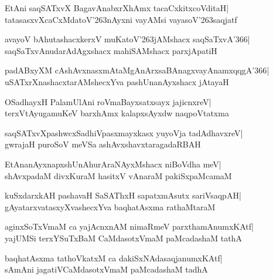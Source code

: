 \documentclass[twoside,12pt,openright]{book}
\def\S{\char'263}
\newcounter{shloka}[chapter]
\begin{document}
\begin{shloka}%
EtAni saqSATxvX BagavAnabxrXhAmx tacaCxkitxcoVditaH|\\
tatasasxvXcaCxMdatoV\S nAyxni vayAMsi vayasoV\S saqjatf
\end{shloka}

\begin{shloka}%
avayoV bAhutashacxkerxV muKatoV\S jAMshacx saqSaTxvA\char'366|\\
saqSaTxvAnudarAdAgxshacx mahiSAMshacx parxjApatiH
\end{shloka}

\begin{shloka}%
padABxyXM cAshAvxnasxmAtaMgAnArxsaBAnagxvayAnamxqqgA\char'366|\\
uSATxrXnashacxtarAMshecxYva pashUnanAyxshacx jAtayaH
\end{shloka}

\begin{shloka}%
OSadhayxH PalamUlAni roVmaBayxsatxsayx jajicnxreV|\\
terxVtAyugamuKeV barxhAmx kalapxsAyxdw naqpoVtatxma
\end{shloka}

\begin{shloka}%
saqSATxvXpashwcxSadhiVpasxmayxkasx yuyoVja tadAdhavxreV|\\
gwrajaH puroSoV meVSa ashAvxshavxtaragadaRBAH
\end{shloka}

\begin{shloka}%
EtAnanAyxnapxshUnAhurAraNAyxMshacx niBoVdha meV|\\
shAvxpadaM divxKuraM hasitxV vAnaraM pakiSxpaMcamaM
\end{shloka}

\begin{shloka}%
kuSxdarxkAH pashavaH SaSAThxH sapatxmAsutx sariVsaqpAH|\\
gAyatarxvatasxyXvashecxYva baqhatAsxma rathaMtaraM
\end{shloka}

\begin{shloka}%
aginxSoTxVmaM ca yajAcnxnAM nimaRmeV parxthamAnumxKAtf|\\
yajUMSi terxYSuTxBaM CaMdasotxVmaM paMcadashaM tathA
\end{shloka}

\begin{shloka}%
baqhatAsxma tathoVkatxM ca dakiSxNAdasaqjanumxKAtf|\\
sAmAni jagatiVCaMdasotxVmaM paMcadashaM tadhA
\end{shloka}
\end{document}
